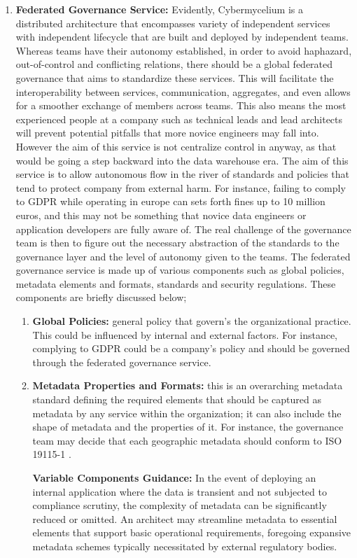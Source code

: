 \documentclass[review]{elsarticle}
\begin{document}
\begin{enumerate}
    
    \item  \textbf{Federated Governance Service:} Evidently, Cybermycelium is a distributed architecture that encompasses variety of independent services with independent lifecycle that are built and deployed by independent teams. Whereas teams have their autonomy established, in order to avoid haphazard, out-of-control and conflicting relations, there should be a global federated governance that aims to standardize these services. This will facilitate the interoperability between services, communication, aggregates, and even allows for a smoother exchange of members across teams. This also means the most experienced people at a company such as technical leads and lead architects will prevent potential pitfalls that more novice engineers may fall into. However the aim of this service is not centralize control in anyway, as that would be going a step backward into the data warehouse era. The aim of this service is to allow autonomous flow in the river of standards and policies that tend to protect company from external harm. For instance, failing to comply to GDPR while operating in europe can sets forth fines up to 10 million euros, and this may not be something that novice data engineers or application developers are fully aware of. The real challenge of the governance team is then to figure out the necessary abstraction of the standards to the governance layer and the level of autonomy given to the teams. The federated governance service is made up of various components such as global policies, metadata elements and formats, standards and security regulations. These components are briefly discussed below;
    \begin{enumerate}
        \item \textbf{Global Policies:} general policy that govern's the organizational practice. This could be influenced by internal and external factors. For instance, complying to GDPR could be a company's policy and should be governed through the federated governance service.
        \item \textbf{Metadata Properties and Formats:} this is an overarching metadata standard defining the required elements that should be captured as metadata by any service within the organization; it can also include the shape of metadata and the properties of it. For instance, the governance team may decide that each geographic metadata should conform to ISO 19115-1 \cite{ISOMetadata}.
        
        \textbf{Variable Components Guidance:} In the event of deploying an internal application where the data is transient and not subjected to compliance scrutiny, the complexity of metadata can be significantly reduced or omitted. An architect may streamline metadata to essential elements that support basic operational requirements, foregoing expansive metadata schemes typically necessitated by external regulatory bodies.


\end{enumerate}
\end{enumerate}
\end{document}
